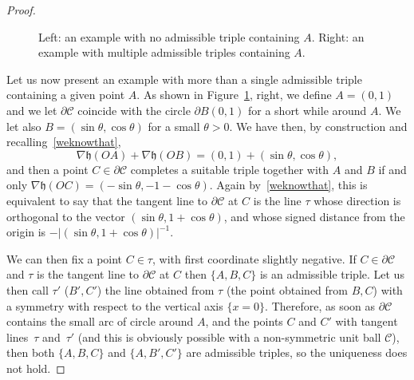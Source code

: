 \documentclass[JEP,XML,SOM,Unicode,NoFloatCountersInSection]{cedram}
\newcommand\C{\mathcal{C}}
\newcommand\h{\mathfrak h}
\theoremstyle{plain}
\theoremstyle{definition}
\begin{document}
\begin{proof}
\begin{figure}[htbp]
\caption{Left: an example with no admissible triple containing $A$. Right: an example with multiple admissible triples containing $A$.}\label{Fignonsymm}
\end{figure}
Let us now present an example with more than a single admissible triple containing a given point $A$. As shown in Figure~\ref{Fignonsymm}, right, we define $A=(0,1)$ and we let $\partial\C$ coincide with the circle $\partial B(0,1)$ for a short while around $A$. We let also $B=(\sin\theta,\cos\theta)$ for a small $\theta>0$. We have then, by construction and recalling~\eqref{weknowthat},
\[
\nabla \h(OA)+\nabla\h(OB)=(0,1) + (\sin\theta,\cos\theta),
\]
and then a point $C\in\partial\C$ completes a suitable triple together with $A$ and $B$ if and only $\nabla\h(OC)=(-\sin\theta,-1-\cos\theta)$. Again by~\eqref{weknowthat}, this is equivalent to say that the tangent line to $\partial\C$ at $C$ is the line $\tau$ whose direction is orthogonal to the vector $(\sin\theta,1+\cos\theta)$, and whose signed distance from the origin is $-\big|(\sin\theta,1+\cos\theta)\big|^{-1}$.\par
We can then fix a point $C\in \tau$, with first coordinate slightly negative. If $C\in\partial\C$ and $\tau$ is the tangent line to $\partial\C$ at $C$ then $\{A,B,C\}$ is an admissible triple. Let us then call $\tau'$ (\resp $B',C'$) the line obtained from $\tau$ (\resp the point obtained from $B,C$) with a symmetry with respect to the vertical axis $\{x=0\}$. Therefore, as soon as $\partial\C$ contains the small arc of circle around $A$, and the points $C$ and $C'$ with tangent lines~$\tau$ and~$\tau'$ (and this is obviously possible with a non-symmetric unit ball $\C$), then both $\{A,B,C\}$ and $\{A,B',C'\}$ are admissible triples, so the uniqueness does not hold.
\end{proof}
\end{document}
